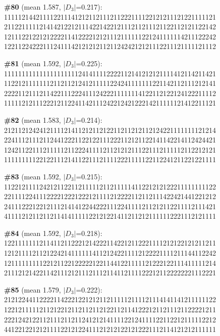 \documentclass[10pt]{article}
\begin{document}
\noindent\textbf{\#80} (mean 1.587, $|D_3|$=0.217):\\
111112144211112211141212112111211222111122121211121221111121\\
211221111121414212212111422142212111211211121122112121122142\\
121112212212122221141222212121112111111221241111114211122242\\
122112242221112411142121212112112424212121112211121111121112\medskip

\noindent\textbf{\#81} (mean 1.592, $|D_3|$=0.225):\\
111111111111111111111241411112222112141212121111412114211421\\
112212111111121121121241211111224241111111221142112111212141\\
222211211121142211122241112422211111114122112122124122211112\\
111112121112221211224114211124221242122214211111121412211121\medskip

\noindent\textbf{\#82} (mean 1.583, $|D_3|$=0.214):\\
212112124241211112141121211212211211212112124221111111121214\\
224111211121124412221122122111222112121122141142214112424421\\
124211221112111112112224111121121212111221112111112112212121\\
111111111221221112141122111211112221111122112241211221221111\medskip

\noindent\textbf{\#83} (mean 1.592, $|D_3|$=0.215):\\
112212111124212112211211111211211111411221212122211111111122\\
221111224111222212221222121111212222112112111422421441221212\\
241112221221211121414122442221112241111211212112211112111421\\
411112121121121141411111221212214112112121111112221112121111\medskip

\noindent\textbf{\#84} (mean 1.592, $|D_3|$=0.218):\\
122111111121141121122212142221142212112221111212122121211211\\
121211112112122421411111141121242211112122221111211144112242\\
121111111112212112212222212211441221111121222122111411111214\\
211121214221142111212111211121141121111222121122222221112221\medskip

\noindent\textbf{\#85} (mean 1.579, $|D_3|$=0.222):\\
212122441122221142221221212112111112111121114141141211111122\\
122121111121121221211211211212211211412221211211121122221211\\
222124212211211121121124121214111122124111122112212111112212\\
441221221212111122121224111212121221212221112114121212111111\medskip
\end{document}
